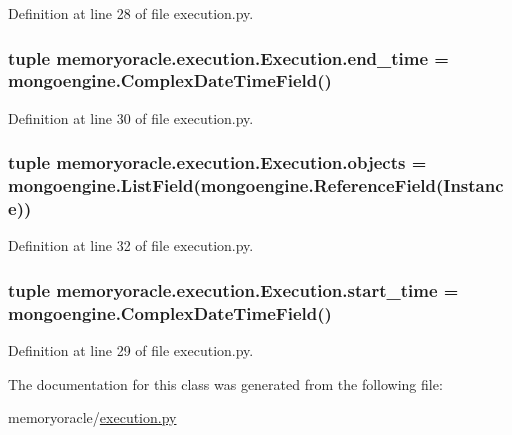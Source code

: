 Definition at line 28 of file execution.\+py.

\hypertarget{classmemoryoracle_1_1execution_1_1Execution_ac03f8d74970a2dcf7e84bf109052118c}{}
\subsubsection[{end\+\_\+time}]{\setlength{\rightskip}{0pt plus 5cm}tuple memoryoracle.\+execution.\+Execution.\+end\+\_\+time = mongoengine.\+Complex\+Date\+Time\+Field()\hspace{0.3cm}{\ttfamily [static]}}\label{classmemoryoracle_1_1execution_1_1Execution_ac03f8d74970a2dcf7e84bf109052118c}


Definition at line 30 of file execution.\+py.

\hypertarget{classmemoryoracle_1_1execution_1_1Execution_a3aeb1a80427e0101619b2db1c43e7e0c}{}
\subsubsection[{objects}]{\setlength{\rightskip}{0pt plus 5cm}tuple memoryoracle.\+execution.\+Execution.\+objects = mongoengine.\+List\+Field(mongoengine.\+Reference\+Field({\bf Instance}))\hspace{0.3cm}{\ttfamily [static]}}\label{classmemoryoracle_1_1execution_1_1Execution_a3aeb1a80427e0101619b2db1c43e7e0c}


Definition at line 32 of file execution.\+py.

\hypertarget{classmemoryoracle_1_1execution_1_1Execution_abe961abfe6caa800e16358a58572eff3}{}
\subsubsection[{start\+\_\+time}]{\setlength{\rightskip}{0pt plus 5cm}tuple memoryoracle.\+execution.\+Execution.\+start\+\_\+time = mongoengine.\+Complex\+Date\+Time\+Field()\hspace{0.3cm}{\ttfamily [static]}}\label{classmemoryoracle_1_1execution_1_1Execution_abe961abfe6caa800e16358a58572eff3}


Definition at line 29 of file execution.\+py.



The documentation for this class was generated from the following file\+:\begin{DoxyCompactItemize}
\item 
memoryoracle/\hyperlink{execution_8py}{execution.\+py}\end{DoxyCompactItemize}

